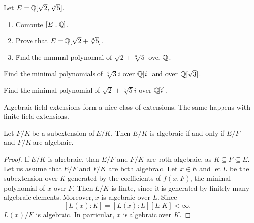 \begin{exercise}
\label{xca:Q(sqrt2,sqrt[3]5)}
    Let $E=\mathbb{Q}[\sqrt{2},\sqrt[3]{5}]$. 
    \begin{enumerate}
        \item Compute $[E:\mathbb{Q}]$.
        \item Prove that $E=\mathbb{Q}[\sqrt{2}+\sqrt[3]{5}]$.
        \item Find the minimal polynomial of $\sqrt{2}+\sqrt[3]{5}$ over $\mathbb{Q}$. 
    \end{enumerate}
\end{exercise}

\begin{exercise}
\label{xca:isqrt[4]3}
    Find the minimal polynomials of $\sqrt[4]{3}i$ over $\mathbb{Q}[i]$ and over $\mathbb{Q}[\sqrt{3}]$. 
\end{exercise}

\begin{exercise}
\label{xca:sqrt{2}+sqrt[3]{5}i}
    Find the minimal polynomial of $\sqrt{2}+\sqrt[3]{5}i$ over $\mathbb{Q}[i]$.
\end{exercise}

%
%
%
Algebraic field extensions form a nice class of extensions. The same happens
with finite field extensions. 

\begin{proposition}
	Let $F/K$ be a subextension of $E/K$. Then $E/K$ is algebraic 
	if and only if $E/F$ and $F/K$ are algebraic. 
\end{proposition}

\begin{proof}
    If $E/K$ is algebraic, then $E/F$ and $F/K$ are both algebraic, 
    as $K\subseteq F\subseteq E$. 
    Let us assume that $E/F$ and $F/K$ are both algebraic. Let $x\in E$ and 
    let $L$ be the subextension over $K$ generated by the coefficients of $f(x,F)$, 
    the minimal polynomial of $x$ over $F$. Then $L/K$ is finite, since it is generated
    by finitely many algebraic elements. Moreover, $x$ is algebraic over $L$. Since 
    \[
    [L(x):K]=[L(x):L][L:K]<\infty,
    \]
    $L(x)/K$ is algebraic. In particular, $x$ is algebraic over $K$. 
\end{proof}


